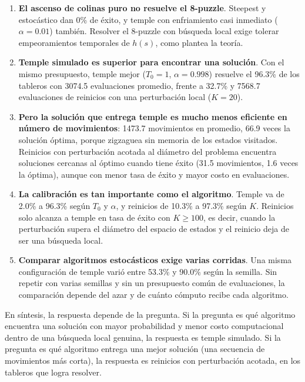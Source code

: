 \documentclass[12pt,a4paper]{article}
\begin{document}
\begin{enumerate}
    \item \textbf{El ascenso de colinas puro no resuelve el 8-puzzle}.
    Steepest y estocástico dan 0\% de éxito, y temple con enfriamiento
    casi inmediato ($\alpha = 0.01$) también. Resolver el 8-puzzle con
    búsqueda local exige tolerar empeoramientos temporales de $h(s)$,
    como plantea la teoría.

    \item \textbf{Temple simulado es superior para encontrar una
    solución}. Con el mismo presupuesto, temple mejor ($T_0 = 1$,
    $\alpha = 0.998$) resuelve el 96.3\% de los tableros con 3074.5
    evaluaciones promedio, frente a 32.7\% y 7568.7 evaluaciones de
    reinicios con una perturbación local ($K = 20$).

    \item \textbf{Pero la solución que entrega temple es mucho menos
    eficiente en número de movimientos}: 1473.7 movimientos en
    promedio, 66.9 veces la solución óptima, porque zigzaguea sin
    memoria de los estados visitados. Reinicios con perturbación
    acotada al diámetro del problema encuentra soluciones cercanas al
    óptimo cuando tiene éxito (31.5 movimientos, 1.6 veces la óptima),
    aunque con menor tasa de éxito y mayor costo en evaluaciones.

    \item \textbf{La calibración es tan importante como el algoritmo}.
    Temple va de 2.0\% a 96.3\% según $T_0$ y $\alpha$, y reinicios de
    10.3\% a 97.3\% según $K$. Reinicios solo alcanza a temple en tasa
    de éxito con $K \ge 100$, es decir, cuando la perturbación supera
    el diámetro del espacio de estados y el reinicio deja de ser una
    búsqueda local.

    \item \textbf{Comparar algoritmos estocásticos exige varias
    corridas}. Una misma configuración de temple varió entre 53.3\% y
    90.0\% según la semilla. Sin repetir con varias semillas y sin un
    presupuesto común de evaluaciones, la comparación depende del azar
    y de cuánto cómputo recibe cada algoritmo.
\end{enumerate}

En síntesis, la respuesta depende de la pregunta. Si la pregunta es
qué algoritmo encuentra una solución con mayor probabilidad y menor
costo computacional dentro de una búsqueda local genuina, la respuesta
es temple simulado. Si la pregunta es qué algoritmo entrega una mejor
solución (una secuencia de movimientos más corta), la respuesta es
reinicios con perturbación acotada, en los tableros que logra resolver.
\end{document}
